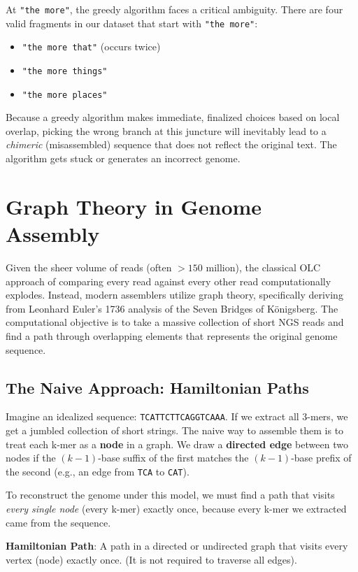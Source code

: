 At \texttt{"the more"}, the greedy algorithm faces a critical ambiguity. There are four valid fragments in our dataset that start with \texttt{"the more"}:
\begin{itemize}
    \item \texttt{"the more that"} (occurs twice)
    \item \texttt{"the more things"}
    \item \texttt{"the more places"}
\end{itemize}
Because a greedy algorithm makes immediate, finalized choices based on local overlap, picking the wrong branch at this juncture will inevitably lead to a \textit{chimeric} (misassembled) sequence that does not reflect the original text. The algorithm gets stuck or generates an incorrect genome.


\section{Graph Theory in Genome Assembly}

Given the sheer volume of reads (often $>150$ million), the classical OLC approach of comparing every read against every other read computationally explodes. Instead, modern assemblers utilize graph theory, specifically deriving from Leonhard Euler's 1736 analysis of the Seven Bridges of Königsberg. The computational objective is to take a massive collection of short NGS reads and find a path through overlapping elements that represents the original genome sequence.

\subsection{The Naive Approach: Hamiltonian Paths}
Imagine an idealized sequence: \texttt{TCATTCTTCAGGTCAAA}. If we extract all 3-mers, we get a jumbled collection of short strings. The naive way to assemble them is to treat each k-mer as a \textbf{node} in a graph. We draw a \textbf{directed edge} between two nodes if the $(k-1)$-base suffix of the first matches the $(k-1)$-base prefix of the second (e.g., an edge from \texttt{TCA} to \texttt{CAT}).

To reconstruct the genome under this model, we must find a path that visits \textit{every single node} (every k-mer) exactly once, because every k-mer we extracted came from the sequence.

\begin{important}
    \textbf{Hamiltonian Path}: A path in a directed or undirected graph that visits every vertex (node) exactly once. (It is not required to traverse all edges).
\end{important}


